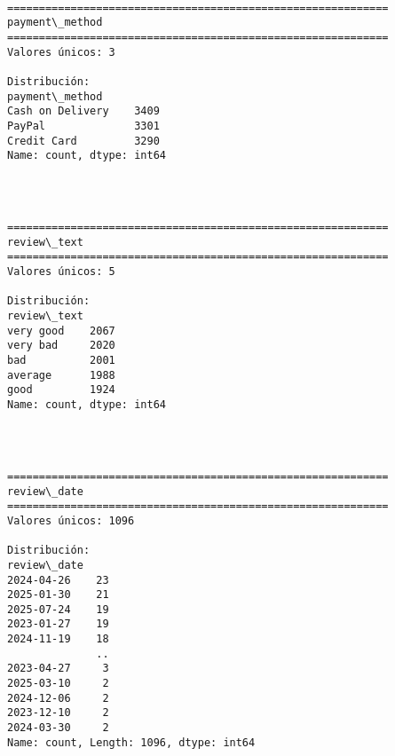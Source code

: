 \documentclass[11pt]{article}
\begin{document}
    \begin{Verbatim}[commandchars=\\\{\}]

============================================================
payment\_method
============================================================
Valores únicos: 3

Distribución:
payment\_method
Cash on Delivery    3409
PayPal              3301
Credit Card         3290
Name: count, dtype: int64
    \end{Verbatim}

    \begin{center}
    \end{center}
    { \hspace*{\fill} \\}
    
    \begin{Verbatim}[commandchars=\\\{\}]

============================================================
review\_text
============================================================
Valores únicos: 5

Distribución:
review\_text
very good    2067
very bad     2020
bad          2001
average      1988
good         1924
Name: count, dtype: int64
    \end{Verbatim}

    \begin{center}
    \end{center}
    { \hspace*{\fill} \\}
    
    \begin{Verbatim}[commandchars=\\\{\}]

============================================================
review\_date
============================================================
Valores únicos: 1096

Distribución:
review\_date
2024-04-26    23
2025-01-30    21
2025-07-24    19
2023-01-27    19
2024-11-19    18
              ..
2023-04-27     3
2025-03-10     2
2024-12-06     2
2023-12-10     2
2024-03-30     2
Name: count, Length: 1096, dtype: int64
    \end{Verbatim}
\end{document}
